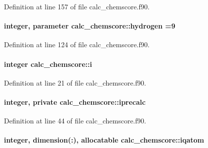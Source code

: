 Definition at line 157 of file calc\-\_\-chemscore.\-f90.

\hypertarget{classcalc__chemscore_a828a4eeea12cf549672d73ad8c68c6c5}{
\paragraph[{hydrogen}]{\setlength{\rightskip}{0pt plus 5cm}integer, parameter calc\-\_\-chemscore\-::hydrogen =9}}\label{classcalc__chemscore_a828a4eeea12cf549672d73ad8c68c6c5}


Definition at line 124 of file calc\-\_\-chemscore.\-f90.

\hypertarget{classcalc__chemscore_a5579c59a11b61014e8a2d04bd984678e}{
\paragraph[{i}]{\setlength{\rightskip}{0pt plus 5cm}integer calc\-\_\-chemscore\-::i}}\label{classcalc__chemscore_a5579c59a11b61014e8a2d04bd984678e}


Definition at line 21 of file calc\-\_\-chemscore.\-f90.

\hypertarget{classcalc__chemscore_a55ea4b33c86233768f0a6f859c2023b6}{
\paragraph[{iprecalc}]{\setlength{\rightskip}{0pt plus 5cm}integer, private calc\-\_\-chemscore\-::iprecalc\hspace{0.3cm}{\ttfamily [private]}}}\label{classcalc__chemscore_a55ea4b33c86233768f0a6f859c2023b6}


Definition at line 44 of file calc\-\_\-chemscore.\-f90.

\hypertarget{classcalc__chemscore_ab620b7f585ddb65438bfcf1bd78a83b0}{
\paragraph[{iqatom}]{\setlength{\rightskip}{0pt plus 5cm}integer, dimension(\-:), allocatable calc\-\_\-chemscore\-::iqatom}}\label{classcalc__chemscore_ab620b7f585ddb65438bfcf1bd78a83b0}



